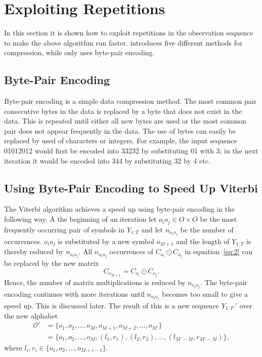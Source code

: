 \section{Exploiting Repetitions}
\label{sec:expl-repet}

In this section it is shown how to exploit repetitions in the observation sequence
to make the above algorithm run faster. \citet{lifshits2009speeding} introduces
five different methods for compression, while \citet{sand2013ziphmmlib} only uses
byte-pair encoding.

\subsection{Byte-Pair Encoding}

Byte-pair encoding is a simple data compression method. The most common pair
consecutive bytes in the data is replaced by a byte that does not exist in the
data. This is repeated until either all new bytes are used or the most common
pair does not appear frequently in the data. The use of bytes can easily be
replaced by used of characters or integers. For example, the input sequence
01012012 would first be encoded into 33232 by substituting 01 with 3; in the
next iteration it would be encoded into 344 by substituting 32 by 4 etc.

\subsection{Using Byte-Pair Encoding to Speed Up Viterbi}
\label{sec:using-byte-pair}

The Viterbi algorithm achieves a speed up using byte-pair encoding in the
following way. A the beginning of an iteration let $o_i o_j \in O \times O$ be
the most frequently occurring pair of symbols in $Y_{1:T}$ and let
$n_{o_i o_j}$ be the number of occurrences. $o_i o_j$ is substituted by a new
symbol $o_{M + 1}$ and the length of $Y_{1:T}$ is thereby reduced by
$n_{o_i o_j}$. All $n_{o_i o_j}$ occurrences of $C_{o_i} \odot C_{o_j}$ in
equation~\eqref{eq:2} can be replaced by the new matrix
\begin{equation}
  \label{eq:7}
  C_{o_{M + 1}} = C_{o_i} \odot C_{o_j}.
\end{equation}
Hence, the number of matrix multiplications is reduced by $n_{o_i o_j}$. The
byte-pair encoding continues with more iterations until $n_{o_i o_j}$ becomes
too small to give a speed up. This is discussed later. The result of this is a
new sequence $Y_{1:T'}'$ over the new alphabet
\begin{equation*}
  \begin{aligned}
    \mathcal{O}' & = \{o_1, o_2, \dots, o_M, o_{M + 1}, o_{M + 2}, \dots, o_{M'} \} \\
                 & = \{o_1, o_2, \dots, o_M, (l_1, r_1), (l_2, r_2), \dots, (l_{M' - M}, r_{M' - M}) \},
  \end{aligned}
\end{equation*}
where $l_i, r_i \in \{o_1, o_2, \dots, o_{M + i - 1} \}$.


